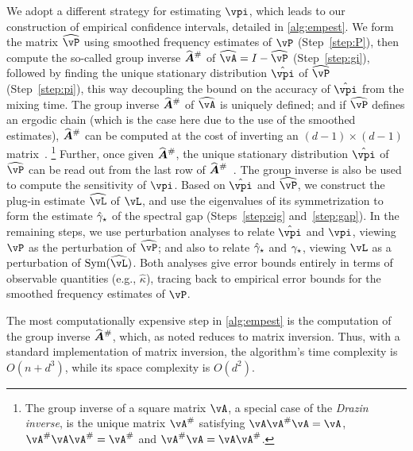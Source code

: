 We adopt a different strategy for estimating $\vpi$, which leads to
our construction of empirical confidence intervals, detailed in
\cref{alg:empest}.
We form the matrix $\wh\vP$ using smoothed frequency estimates of
$\vP$ (Step~\ref{step:P}), then compute the so-called group inverse
$\giAh$ of $\wh\vA = I - \wh\vP$ (Step~\ref{step:gi}), followed by
finding the unique stationary distribution $\hat\vpi$ of $\wh\vP$
(Step~\ref{step:pi}), this way decoupling the bound on the accuracy of $\hat\vpi$
from the mixing time.
The group inverse $\giAh$ of $\wh\vA$ is uniquely defined;
 and if
$\wh\vP$ defines an ergodic chain (which is the case here due to the
use of the smoothed estimates), $\giAh$ can be computed at the cost of
inverting an $(d-1)\times (d-1)$ matrix~\citep[Theorem
5.2]{meyer1975role}.%
\footnote{
\label{ftnote:group-inverse}
The group inverse of a square matrix $\vA$, a special case of the {\em Drazin inverse},
is the unique matrix $\vA^\#$ satisfying
$ \vA\vA^\#\vA = \vA$,
$\vA^\#\vA\vA^\# = \vA^\#$ and
$\vA^\#\vA = \vA\vA^\#$.
}
Further, once given $\giAh$, the unique stationary distribution
$\hat\vpi$ of $\wh\vP$ can be read out from the last row of
$\giAh$~\citep[Theorem 5.3]{meyer1975role}.
The group inverse is also be used to compute the sensitivity of
$\vpi$.
Based on $\hat\vpi$ and $\wh\vP$, we construct the plug-in estimate
$\wh\vL$ of $\vL$, and use the eigenvalues of its symmetrization to
form the estimate $\hat\gamma_{\star}$ of the spectral gap (Steps~\ref{step:eig}
and~\ref{step:gap}).
In the remaining steps, 
we use perturbation analyses to relate $\hat\vpi$ and $\vpi$, viewing
$\vP$ as the perturbation of $\wh\vP$; and also to relate $\hat\gamma_{\star}$
and $\gamma_{\star}$, viewing $\vL$ as a perturbation of $\Sym(\wh\vL)$.
Both analyses give error bounds entirely in terms of observable
quantities (e.g., $\hat\kappa$), tracing back to empirical error
bounds for the smoothed frequency estimates of $\vP$.

The most computationally expensive step in \cref{alg:empest} is the
computation of the group inverse $\giAh$, which, as noted reduces to
matrix inversion.
Thus, with a standard implementation of matrix inversion, the
algorithm's time complexity is $O(n + d^3)$, while its space
complexity is $O(d^2)$.

